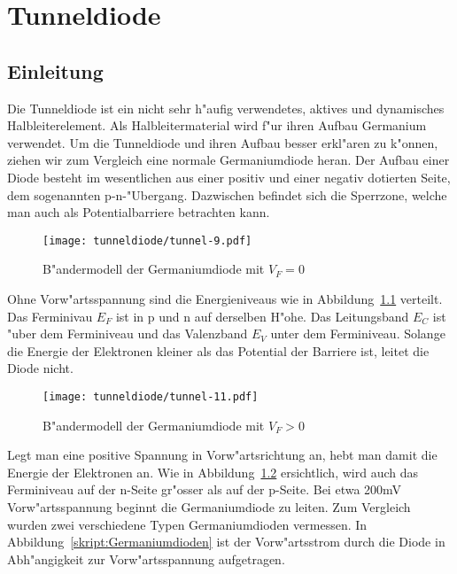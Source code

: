 \newcommand{\RM}[1]{\MakeUppercase{\romannumeral #1{}}}

\chapter{Tunneldiode\label{chapter:tunneldiode}}
\begin{refsection}

\newpage
\section{Einleitung}

Die Tunneldiode ist ein nicht sehr h"aufig verwendetes, aktives und dynamisches Halbleiterelement. Als Halbleitermaterial wird f"ur ihren  Aufbau Germanium verwendet. Um die Tunneldiode und ihren Aufbau besser erkl"aren zu k"onnen, ziehen wir zum Vergleich eine normale Germaniumdiode heran. 
Der Aufbau einer Diode besteht im wesentlichen aus einer positiv und einer negativ dotierten Seite, dem sogenannten p-n-"Ubergang. Dazwischen befindet sich die Sperrzone, welche man auch als Potentialbarriere betrachten kann.

\begin{figure}	%
\centering
\texttt{[image: tunneldiode/tunnel-9.pdf]}
\caption{B"andermodell der Germaniumdiode mit $V_F = 0$
\label{skript:BaendermodellG0}}
\end{figure}

Ohne Vorw"artsspannung sind die Energieniveaus wie in Abbildung~\ref{skript:BaendermodellG0} verteilt. Das Ferminivau $E_F$ ist in p und n auf derselben H"ohe. Das Leitungsband $E_C$ ist "uber dem Ferminiveau  und das Valenzband $E_V$ unter dem Ferminiveau. Solange die Energie der Elektronen kleiner als das Potential der Barriere ist, leitet die Diode nicht. 

\begin{figure}	%
\centering
\texttt{[image: tunneldiode/tunnel-11.pdf]}
\caption{B"andermodell der Germaniumdiode mit $V_F > 0$
\label{skript:BaendermodellG}}
\end{figure}

Legt man eine positive Spannung in Vorw"artsrichtung an, hebt man damit die Energie der Elektronen an. Wie in  Abbildung~\ref{skript:BaendermodellG} ersichtlich, wird auch das Ferminiveau auf der n-Seite gr"osser als auf der p-Seite. Bei etwa 200mV Vorw"artsspannung beginnt die Germaniumdiode zu leiten. Zum Vergleich wurden zwei verschiedene Typen Germaniumdioden vermessen. In Abbildung~\ref{skript:Germaniumdioden} ist der Vorw"artsstrom durch die Diode in Abh"angigkeit zur Vorw"artsspannung aufgetragen.


\end{refsection}
